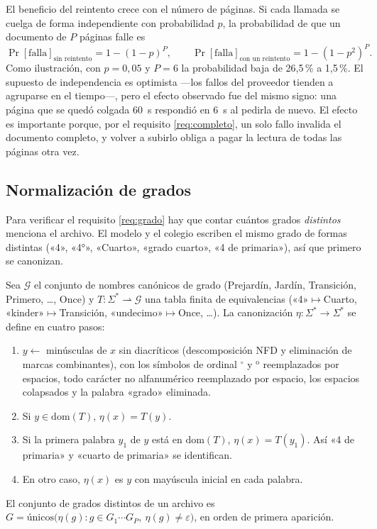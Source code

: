 El beneficio del reintento crece con el número de páginas. Si cada llamada se
cuelga de forma independiente con probabilidad $p$, la probabilidad de que un
documento de $P$ páginas falle es
\[
  \Pr[\text{falla}]_{\text{sin reintento}} = 1-(1-p)^P,
  \qquad
  \Pr[\text{falla}]_{\text{con un reintento}} = 1-(1-p^2)^P.
\]
Como ilustración, con $p=0{,}05$ y $P=6$ la probabilidad baja de 26,5\,\%
a 1,5\,\%. El supuesto de independencia es optimista ---los fallos del
proveedor tienden a agruparse en el tiempo---, pero el efecto observado fue del
mismo signo: una página que se quedó colgada 60~s respondió en 6~s al pedirla
de nuevo. El efecto es importante porque, por el requisito
\ref{req:completo}, un solo fallo invalida el documento completo, y volver a
subirlo obliga a pagar la lectura de todas las páginas otra vez.

\subsection{Normalización de grados}
\label{sec:per-grados}

Para verificar el requisito \ref{req:grado} hay que contar cuántos grados
\emph{distintos} menciona el archivo. El modelo y el colegio escriben el mismo
grado de formas distintas («4», «4°», «Cuarto», «grado cuarto», «4 de
primaria»), así que primero se canonizan.

\begin{definicion}
\label{def:canon-grado}
Sea $\mathcal{G}$ el conjunto de nombres canónicos de grado (Prejardín,
Jardín, Transición, Primero, \dots, Once) y $T\colon\Sigma^*\rightharpoonup
\mathcal{G}$ una tabla finita de equivalencias («4»$\mapsto$Cuarto,
«kinder»$\mapsto$Transición, «undecimo»$\mapsto$Once, \dots). La canonización
$\eta\colon\Sigma^*\to\Sigma^*$ se define en cuatro pasos:
\begin{enumerate}
  \item $y\gets$ minúsculas de $x$ sin diacríticos (descomposición NFD y
        eliminación de marcas combinantes), con los símbolos de ordinal
        $^{\circ}$ y $^{\mathrm{o}}$ reemplazados por espacios, todo carácter
        no alfanumérico reemplazado por espacio, los espacios colapsados y la
        palabra «grado» eliminada.
  \item Si $y\in\mathrm{dom}(T)$, $\eta(x)=T(y)$.
  \item Si la primera palabra $y_1$ de $y$ está en $\mathrm{dom}(T)$,
        $\eta(x)=T(y_1)$. Así «4 de primaria» y «cuarto de primaria» se
        identifican.
  \item En otro caso, $\eta(x)$ es $y$ con mayúscula inicial en cada palabra.
\end{enumerate}
El conjunto de grados distintos de un archivo es
$G=\mathrm{únicos}\bigl(\eta(g) : g\in G_1\cdots G_P,\ \eta(g)\neq\varepsilon\bigr)$,
en orden de primera aparición.
\end{definicion}

